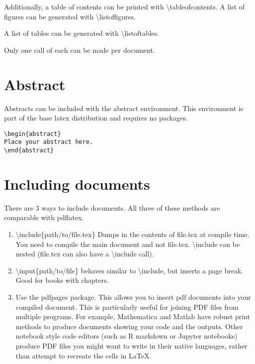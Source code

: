 \documentclass[11pt]{article}
\begin{document}
Additionally, a table of contents can be printed with \textbackslash tableofcontents.
\tableofcontents \label{toc}
A list of figures can be generated with \textbackslash listoffigures.
\listoffigures
A list of tables can be generated with \textbackslash listoftables.
\listoftables

Only one call of each can be made per document. 
\section{Abstract}
Abstracts can be included with the abstract environment. This environment is part of the base latex distribution and requires no packages.
\begin{verbatim}
\begin{abstract}
Place your abstract here.
\end{abstract}
\end{verbatim}
\section{Including documents}
There are 3 ways to include documents. All three of these methods are comparable with pdflatex. 
\begin{enumerate}
	\item \textbackslash include\{path/to/file.tex\} Dumps in the contents of file.tex at compile time. You need to compile the main document and not file.tex. \textbackslash include can be nested (file.tex can also have a \textbackslash include call).
	\item \textbackslash input\{path/to/file\} behaves similar to \textbackslash include, but inserts a page break. Good for books with chapters. 
	\item Use the pdfpages package. This allows you to insert pdf documents into your compiled document. This is particularly useful for joining PDF files from multiple programs. For example, Mathematica and Matlab have robust print methods to produce documents showing your code and the outputs. Other notebook style code editors (such as R markdown or Jupyter notebooks) produce PDF files you might want to write in their native languages, rather than attempt to recreate the cells in \LaTeX.
\end{enumerate}
\end{document}
